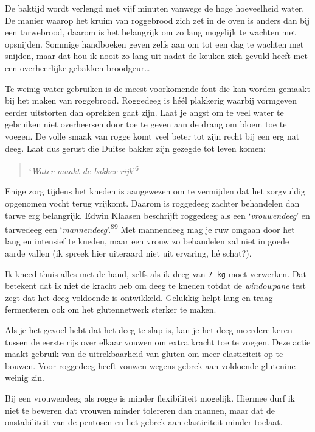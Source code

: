 \documentclass[
  11pt,
  dutch,
]{memoir}
\begin{document}
De baktijd wordt verlengd met vijf minuten vanwege de hoge hoeveelheid
water. De manier waarop het kruim van roggebrood zich zet in de oven is
anders dan bij een tarwebrood, daarom is het belangrijk om zo lang
mogelijk te wachten met opsnijden. Sommige handboeken geven zelfs aan om
tot een dag te wachten met snijden, maar dat hou ik nooit zo lang uit
nadat de keuken zich gevuld heeft met een overheerlijke gebakken
broodgeur\ldots{}

Te weinig water gebruiken is de meest voorkomende fout die kan worden
gemaakt bij het maken van roggebrood. Roggedeeg is héél plakkerig
waarbij vormgeven eerder uitstorten dan oprekken gaat zijn. Laat je
angst om te veel water te gebruiken niet overheersen door toe te geven
aan de drang om bloem toe te voegen. De volle smaak van rogge komt veel
beter tot zijn recht bij een erg nat deeg. Laat dus gerust die Duitse
bakker zijn gezegde tot leven komen:

\begin{quote}
`\emph{Water maakt de bakker rijk}'\textsuperscript{6}
\end{quote}

Enige zorg tijdens het kneden is aangewezen om te vermijden dat het
zorgvuldig opgenomen vocht terug vrijkomt. Daarom is roggedeeg zachter
behandelen dan tarwe erg belangrijk. Edwin Klaasen beschrijft roggedeeg
als een `\emph{vrouwendeeg}' en tarwedeeg een
`\emph{mannendeeg}'.\textsuperscript{89} Met mannendeeg mag je ruw
omgaan door het lang en intensief te kneden, maar een vrouw zo
behandelen zal niet in goede aarde vallen (ik spreek hier uiteraard niet
uit ervaring, hé schat?).

Ik kneed thuis alles met de hand, zelfs als ik deeg van \texttt{7\ kg}
moet verwerken. Dat betekent dat ik niet de kracht heb om deeg te kneden
totdat de \emph{windowpane} test zegt dat het deeg voldoende is
ontwikkeld. Gelukkig helpt lang en traag fermenteren ook om het
glutennetwerk sterker te maken.

Als je het gevoel hebt dat het deeg te slap is, kan je het deeg meerdere
keren tussen de eerste rijs over elkaar vouwen om extra kracht toe te
voegen. Deze actie maakt gebruik van de uitrekbaarheid van gluten om
meer elasticiteit op te bouwen. Voor roggedeeg heeft vouwen wegens
gebrek aan voldoende glutenine weinig zin.

Bij een vrouwendeeg als rogge is minder flexibiliteit mogelijk. Hiermee
durf ik niet te beweren dat vrouwen minder tolereren dan mannen, maar
dat de onstabiliteit van de pentosen en het gebrek aan elasticiteit
minder toelaat.
\end{document}
